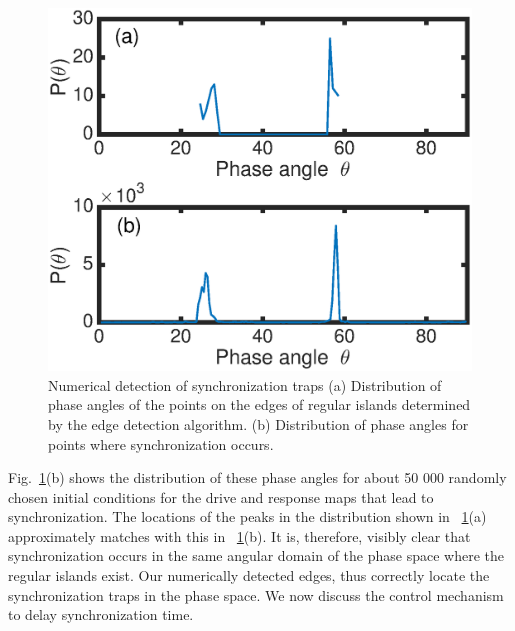 \documentclass[reprint,amsmath,amssymb,aps,pre]{revtex4-1}
\begin{document}
\begin{figure}[h]
	\includegraphics[scale=0.45]{Edge_Sync_angles}
	\caption{\label{fig:Edge_Sync_angles} \footnotesize Numerical detection of 
		synchronization traps (a) Distribution of phase 
		angles of the points on the edges of regular islands determined by the edge 
		detection algorithm. (b) Distribution of phase angles for points where 
		synchronization occurs. }
\end{figure}

Fig.~\ref{fig:Edge_Sync_angles}(b) shows the distribution of these phase angles for about 50 000 randomly chosen initial conditions for the drive and response maps that lead to synchronization. The locations of the peaks in the distribution shown in ~\ref{fig:Edge_Sync_angles}(a) approximately matches with this in ~\ref{fig:Edge_Sync_angles}(b). It is, therefore, visibly clear that synchronization occurs in the same angular domain of the phase space where the regular islands exist. Our numerically detected edges, thus correctly locate the synchronization traps in the phase space.  We now discuss the control mechanism to delay synchronization time. 
\end{document}
